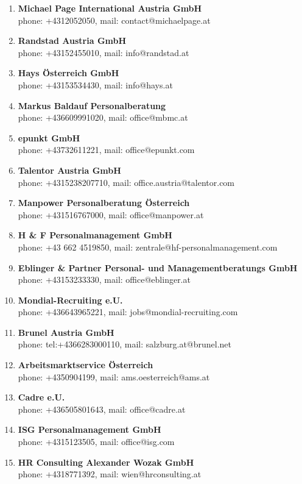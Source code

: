 \documentclass[draft,final]{thesisclass} %
\begin{document}
\begin{enumerate}
    \item \textbf{Michael Page International Austria GmbH}\\
    phone: +4312052050, mail: contact@michaelpage.at
    \item \textbf{Randstad Austria GmbH}\\
    phone: +43152455010, mail: info@randstad.at
    \item \textbf{Hays Österreich GmbH}\\
    phone: +43153534430, mail: info@hays.at
    \item \textbf{Markus Baldauf Personalberatung}\\
    phone: +436609991020, mail: office@mbmc.at
    \item \textbf{epunkt GmbH}\\
    phone: +43732611221, mail: office@epunkt.com
    \item \textbf{Talentor Austria GmbH}\\
    phone: +4315238207710, mail: office.austria@talentor.com
    \item \textbf{Manpower Personalberatung Österreich}\\
    phone: +431516767000, mail: office@manpower.at
    \item \textbf{H \& F Personalmanagement GmbH}\\
    phone: +43 662 4519850, mail: zentrale@hf-personalmanagement.com
    \item \textbf{Eblinger \& Partner Personal- und Managementberatungs GmbH}\\
    phone: +43153233330, mail: office@eblinger.at
    \item \textbf{Mondial-Recruiting e.U.}\\
    phone: +436643965221, mail: jobs@mondial-recruiting.com
    \item \textbf{Brunel Austria GmbH}\\
    phone: tel:+4366283000110, mail: salzburg.at@brunel.net
    \item \textbf{Arbeitsmarktservice Österreich}\\
    phone: +4350904199, mail: ams.oesterreich@ams.at
    \item \textbf{Cadre e.U.}\\
    phone: +436505801643, mail: office@cadre.at
    \item \textbf{ISG Personalmanagement GmbH}\\
    phone: +4315123505, mail: office@isg.com
    \item \textbf{HR Consulting Alexander Wozak GmbH}\\
    phone: +4318771392, mail: wien@hrconsulting.at
\end{enumerate}
\end{document}
